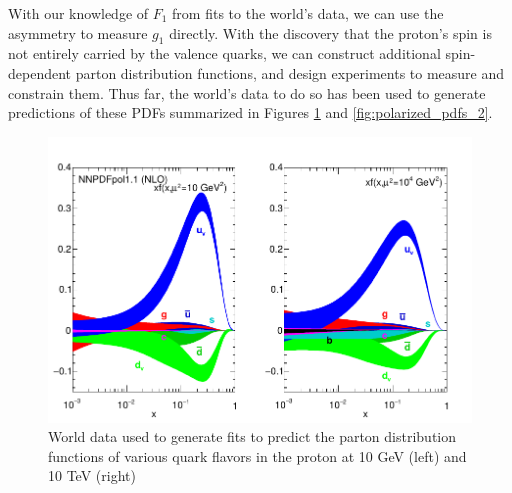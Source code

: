 With our knowledge of $F_1$ from fits to the world's data, we can use the
asymmetry to measure $g_1$ directly. With the discovery that the proton's spin
is not entirely carried by the valence quarks, we can construct additional
spin-dependent parton distribution functions, and design experiments to measure
and constrain them. Thus far, the world's data to do so has been used to
generate predictions of these PDFs summarized in Figures
\ref{fig:polarized_pdfs_1} and \ref{fig:polarized_pdfs_2}.

\begin{figure}[ht]
  \centering
  \includegraphics[width=0.7\linewidth]{./figures/polarized_pdfs.pdf}
  \caption{
    World data used to generate fits to predict the parton distribution
    functions of various quark flavors in the proton at 10 GeV (left) and 10
    TeV (right)~\cite{ReviewEidelman2012}
  }
  \label{fig:polarized_pdfs_1}
\end{figure}

